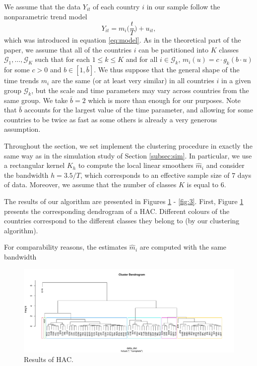 \documentclass[a4paper,11pt]{article}
\numberwithin{equation}{section}
\begin{document}
We assume that the data $Y_{it}$ of each country $i$ in our sample follow the nonparametric trend model 
\[ Y_{it} = m_i\Big(\frac{t}{T}\Big) + u_{it}, \]
which was introduced in equation \eqref{eq:model}. As in the theoretical part of the paper, we assume that all of the countries $i$ can be partitioned into $K$ classes $\mathcal{G}_1, \ldots, \mathcal{G}_K$ such that for each $1 \leq k\leq K$ and for all $i \in \mathcal{G}_k$, $m_i(u) = c \cdot g_k(b \cdot u)$ for some $c>0$ and $b\in[1, \bar{b}]$. We thus suppose that the general shape of the time trends $m_i$ are the same (or at least very similar) in all countries $i$ in a given group $\mathcal{G}_k$, but the scale and time parameters may vary across countries from the same group. We take $\bar{b} = 2$ which is more than enough for our purposes. Note that $\bar{b}$ accounts for the largest value of the time parameter, and allowing for some countries to be twice as fast as some others is already a very generous assumption.

Throughout the section, we set implement the clustering procedure in exactly the same way as in the simulation study of Section \ref{subsec:sim}. In particular, we use a rectangular kernel $K_h$ to compute the local linear smoothers $\hat{m}_{i}$ and consider the bandwidth $h = 3.5/T$, which corresponds to an effective sample size of $7$ days of data. Moreover, we assume that the number of classes $K$ is equal to $6$.
 
The results of our algorithm are presented in Figures \ref{fig:dend} - \ref{fig:3}. First, Figure \ref{fig:dend} presents the corresponding dendrogram of a HAC. Different colours of the countries correspond to the different classes they belong to (by our clustering algorithm).

For comparability reasons, the estimates $\hat{m}_i$ are computed with the same bandwidth


\begin{figure}[p!]
\begin{minipage}[t]{0.98\textwidth}
\includegraphics[width=\textwidth]{plots/dendrogram}
\caption{Results of HAC.}\label{fig:dend}
\end{minipage}
\end{figure}


\newpage

{\small
\setlength{\bibsep}{0.35em}
}
\end{document}
